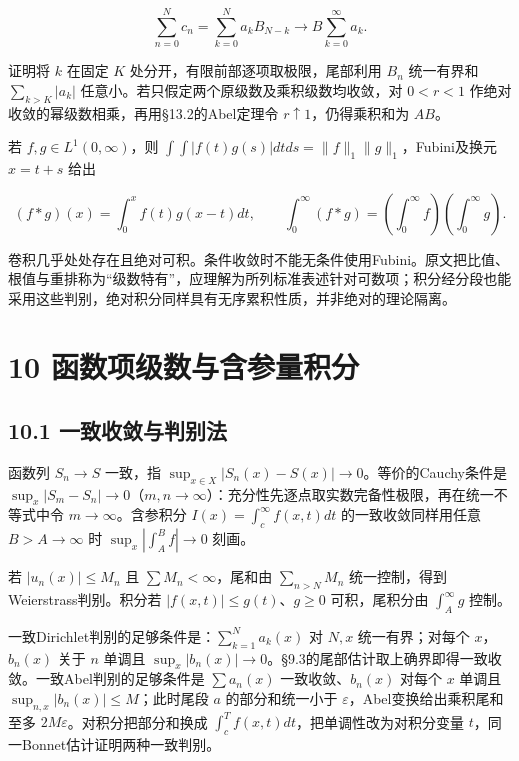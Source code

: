 \documentclass[11pt,a4paper]{article}
\begin{document}
\[
\sum_{n=0}^Nc_n=\sum_{k=0}^Na_kB_{N-k}\longrightarrow B\sum_{k=0}^\infty a_k.
\]

证明将 \(k\) 在固定 \(K\) 处分开，有限前部逐项取极限，尾部利用 \(B_n\)
统一有界和 \(\sum_{k>K}|a_k|\)
任意小。若只假定两个原级数及乘积级数均收敛，对 \(0<r<1\)
作绝对收敛的幂级数相乘，再用§13.2的Abel定理令
\(r\uparrow1\)，仍得乘积和为 \(AB\)。

若 \(f,g\in L^1(0,\infty)\)，则
\(\int\!\int|f(t)g(s)|dt ds=\|f\|_1\|g\|_1\)，Fubini及换元 \(x=t+s\)
给出

\[
(f*g)(x)=\int_0^xf(t)g(x-t)dt,\qquad
\int_0^\infty(f*g)=(\int_0^\infty f)(\int_0^\infty g).
\]

卷积几乎处处存在且绝对可积。条件收敛时不能无条件使用Fubini。原文把比值、根值与重排称为``级数特有''，应理解为所列标准表述针对可数项；积分经分段也能采用这些判别，绝对积分同样具有无序累积性质，并非绝对的理论隔离。

\clearpage

\section{10
函数项级数与含参量积分}\label{ux51fdux6570ux9879ux7ea7ux6570ux4e0eux542bux53c2ux91cfux79efux5206}

\subsection{10.1
一致收敛与判别法}\label{ux4e00ux81f4ux6536ux655bux4e0eux5224ux522bux6cd5}

函数列 \(S_n\to S\) 一致，指
\(\sup_{x\in X}|S_n(x)-S(x)|\to0\)。等价的Cauchy条件是
\(\sup_x|S_m-S_n|\to0\)（\(m,n\to\infty\)）：充分性先逐点取实数完备性极限，再在统一不等式中令
\(m\to\infty\)。含参积分 \(I(x)=\int_c^\infty f(x,t)dt\)
的一致收敛同样用任意 \(B>A\to\infty\) 时 \(\sup_x|\int_A^Bf|\to0\)
刻画。

若 \(|u_n(x)|\le M_n\) 且 \(\sum M_n<\infty\)，尾和由 \(\sum_{n>N}M_n\)
统一控制，得到Weierstrass判别。积分若 \(|f(x,t)|\le g(t)\)、\(g\ge0\)
可积，尾积分由 \(\int_A^\infty g\) 控制。

一致Dirichlet判别的足够条件是：\(\sum_{k=1}^Na_k(x)\) 对 \(N,x\)
统一有界；对每个 \(x\)，\(b_n(x)\) 关于 \(n\) 单调且
\(\sup_x|b_n(x)|\to0\)。§9.3的尾部估计取上确界即得一致收敛。一致Abel判别的足够条件是
\(\sum a_n(x)\) 一致收敛、\(b_n(x)\) 对每个 \(x\) 单调且
\(\sup_{n,x}|b_n(x)|\le M\)；此时尾段 \(a\) 的部分和统一小于
\(\varepsilon\)，Abel变换给出乘积尾和至多
\(2M\varepsilon\)。对积分把部分和换成
\(\int_c^Tf(x,t)dt\)，把单调性改为对积分变量
\(t\)，同一Bonnet估计证明两种一致判别。
\end{document}
